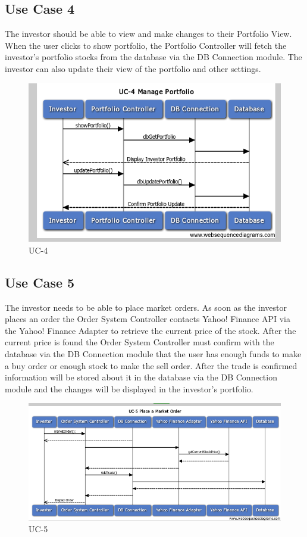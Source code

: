 \subsection{Use Case 4}
The investor should be able to view and make changes to their Portfolio View.
When the user clicks to show portfolio, the Portfolio Controller will fetch the
investor’s portfolio stocks from the database via the DB Connection module. The
investor can also update their view of the portfolio and other settings.

\begin{figure}[H]
\centering
\includegraphics[width=5.5in]{./img/inter/UC4.png}
\caption{UC-4}
\end{figure}

\subsection{Use Case 5}
The investor needs to be able to place market orders. As soon as the investor
places an order the Order System Controller contacts Yahoo! Finance API via the
Yahoo! Finance Adapter to retrieve the current price of the stock. After the
current price is found the Order System Controller must confirm with the
database via the DB Connection module that the user has enough funds to make a
buy order or enough stock to make the sell order. After the trade is confirmed
information will be stored about it in the database via the DB Connection
module and the changes will be displayed in the investor’s portfolio.

\begin{figure}[H]
\centering
\includegraphics[width=5.5in]{./img/inter/UC5.png}
\caption{UC-5}
\end{figure}

